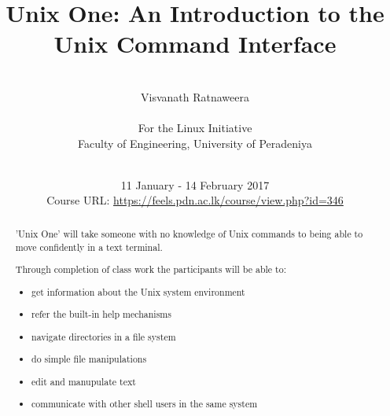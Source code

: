 \documentclass[11pt,a4paper,twoside]{article}
\begin{document}
\title{Unix One: An Introduction to the \\ Unix Command Interface}

\author{\\ Visvanath Ratnaweera \\
\\
For the Linux Initiative \\ Faculty of Engineering, University of Peradeniya \\
\\ }
\date{11 January - 14 February 2017 \\
Course URL: \url{https://feels.pdn.ac.lk/course/view.php?id=346}}

\maketitle
\thispagestyle{empty}

\begin{abstract}
'Unix One' will take someone with no knowledge of Unix commands to being 
able to move confidently in a text terminal. 

Through completion of class work the participants will be able to:
\begin{itemize}

\item get information about the Unix system environment

\item refer the built-in help mechanisms

\item navigate directories in a file system

\item do simple file manipulations

\item edit and manupulate text

\item communicate with other shell users in the same system

\end{itemize}
\end{abstract}

\newpage

\setcounter{page}{1}
\pagestyle{fancy}
\fancyhead{}
\fancyfoot{}
\renewcommand{\headrulewidth}{0pt}
\renewcommand{\dateseparator}{-}
\fancyfoot[LE,RO]{\thepage}

\setcounter{tocdepth}{2}
\tableofcontents
{}
\end{document}
